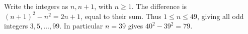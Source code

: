 Write the integers as $n,n+1$, with $n\ge1$. The difference is $(n+1)^2-n^2=2n+1$, equal to their sum. Thus $1\le n\le49$, giving all odd integers $3,5,\ldots,99$. In particular $n=39$ gives $40^2-39^2=\boxed{79}$.
